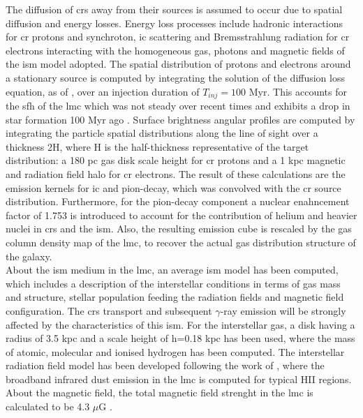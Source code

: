 \documentclass[main.tex]{subfiles}
\begin{document}
The diffusion of \glspl{cr} away from their sources is assumed to occur due to spatial diffusion and energy losses. Energy loss processes include hadronic interactions for \gls{cr} protons and synchroton, \gls{ic} scattering and Bremsstrahlung radiation for \gls{cr} electrons interacting with the homogeneous gas, photons and magnetic fields of the \gls{ism} model adopted. The spatial distribution of protons and electrons around a stationary source is computed by integrating the solution of the diffusion loss equation, as of \cite{2006diffusionloss}, over an injection duration of $T_{inj} = 100$ Myr. This accounts for the \gls{sfh} of the \gls{lmc} which was not steady over recent times and exhibits a drop in star formation 100 Myr ago \cite{2009SFHofLMC}. Surface brightness angular profiles are computed by integrating the particle spatial distributions along the line of sight over a thickness 2H, where H is the half-thickness representative of the target distribution: a 180 pc gas disk scale height for \gls{cr} protons and a 1 kpc magnetic and radiation field halo for \gls{cr} electrons. The result of these calculations are the emission kernels for \gls{ic} and pion-decay, which was convolved with the \gls{cr} source distribution. Furthermore, for the pion-decay component a nuclear enahncement factor of 1.753 is introduced to account for the contribution of helium and heavier nuclei in \glspl{cr} and the \gls{ism}. Also, the resulting emission cube is rescaled by the gas column density map of the \gls{lmc}, to recover the actual gas distribution structure of the galaxy.\\
About the \gls{ism} medium in the \gls{lmc}, an average \gls{ism} model has been computed, which includes a description of the interstellar conditions in terms of gas mass and structure, stellar population feeding the radiation fields and magnetic field configuration. The \glspl{cr} transport and subsequent $\gamma$-ray emission will be strongly affected by the characteristics of this \gls{ism}. For the interstellar gas, a disk having a radius of 3.5 kpc and a scale height of h=0.18 kpc has been used, where the mass of atomic, molecular and ionised hydrogen has been computed. The interstellar radiation field model has been developed following the work of \cite{2014DustEMLMCismemission}, where the broadband infrared dust emission in the \gls{lmc} is computed for typical HII regions. About the magnetic field, the total magnetic field strenght in the \gls{lmc} is calculated to be 4.3 $\mu$G \cite{2005LMCmagneticfield}.     
\end{document}
